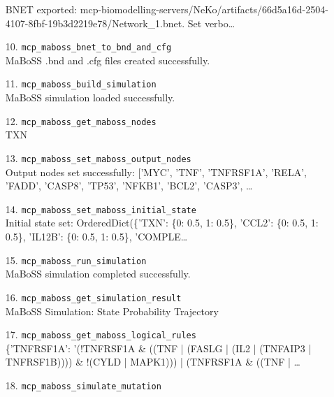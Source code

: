 \begin{enumerate}
\RaggedRight BNET exported: mcp-biomodelling-servers/NeKo/artifacts/66d5a16d-2504-4107-8fbf-19b3d2219e78/Network\_1.bnet. Set verbo\ldots{}
\item[10.] \texttt{mcp\_\allowbreak{}maboss\_\allowbreak{}bnet\_\allowbreak{}to\_\allowbreak{}bnd\_\allowbreak{}and\_\allowbreak{}cfg}
\hfill\\
\RaggedRight MaBoSS .bnd and .cfg files created successfully.
\item[11.] \texttt{mcp\_\allowbreak{}maboss\_\allowbreak{}build\_\allowbreak{}simulation}
\hfill\\
\RaggedRight MaBoSS simulation loaded successfully.
\item[12.] \texttt{mcp\_\allowbreak{}maboss\_\allowbreak{}get\_\allowbreak{}maboss\_\allowbreak{}nodes}
\hfill\\
\RaggedRight TXN
\item[13.] \texttt{mcp\_\allowbreak{}maboss\_\allowbreak{}set\_\allowbreak{}maboss\_\allowbreak{}output\_\allowbreak{}nodes}
\hfill\\
\RaggedRight Output nodes set successfully: ['MYC', 'TNF', 'TNFRSF1A', 'RELA', 'FADD', 'CASP8', 'TP53', 'NFKB1', 'BCL2', 'CASP3', \ldots{}
\item[14.] \texttt{mcp\_\allowbreak{}maboss\_\allowbreak{}set\_\allowbreak{}maboss\_\allowbreak{}initial\_\allowbreak{}state}
\hfill\\
\RaggedRight Initial state set: OrderedDict(\{'TXN': \{0: 0.5, 1: 0.5\}, 'CCL2': \{0: 0.5, 1: 0.5\}, 'IL12B': \{0: 0.5, 1: 0.5\}, 'COMPLE\ldots{}
\item[15.] \texttt{mcp\_\allowbreak{}maboss\_\allowbreak{}run\_\allowbreak{}simulation}
\hfill\\
\RaggedRight MaBoSS simulation completed successfully.
\item[16.] \texttt{mcp\_\allowbreak{}maboss\_\allowbreak{}get\_\allowbreak{}simulation\_\allowbreak{}result}
\hfill\\
\RaggedRight MaBoSS Simulation: State Probability Trajectory
\item[17.] \texttt{mcp\_\allowbreak{}maboss\_\allowbreak{}get\_\allowbreak{}maboss\_\allowbreak{}logical\_\allowbreak{}rules}
\hfill\\
\RaggedRight \{'TNFRSF1A': '(!TNFRSF1A \& ((TNF | (FASLG | (IL2 | (TNFAIP3 | TNFRSF1B)))) \& !(CYLD | MAPK1))) | (TNFRSF1A \& ((TNF | \ldots{}
\item[18.] \texttt{mcp\_\allowbreak{}maboss\_\allowbreak{}simulate\_\allowbreak{}mutation}
\hfill\\

\end{enumerate}
